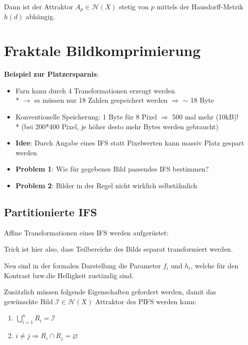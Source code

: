 \documentclass[afourpaper]{latex-classes/handout}
\newcommand{\marginrule}{\makebox[\linewidth]{\rule{\linewidth}{0.4pt}}}
\renewcommand{\emph}[1]{\textcolor{kitGreen}{#1}}
\begin{document}
Dann ist der Attraktor \( A_p \in \mathcal{H}(X) \) stetig von \( p \) mittels der Hausdorff-Metrik \( h(d) \) abhängig.

\section{Fraktale Bildkomprimierung}

\begin{marginfigure}[10em]
  \textbf{Beispiel zur Platzersparnis}: \\
  \begin{itemize}
    \item Farn kann durch 4 Transformationen erzeugt werden \\*
      \( \to \) es müssen nur 18 Zahlen gespeichert werden \( \Rightarrow \) \emph{\( \sim \) 18 Byte}
    \item Konventionelle Speicherung: 1 Byte für 8 Pixel \( \Rightarrow \) \emph{500 mal mehr} (10kB)! \\*
    (bei 200*400 Pixel, je höher desto mehr Bytes werden gebraucht)
  \end{itemize}
  \marginrule{}
\end{marginfigure}

\begin{itemize}
  \item \textbf{Idee}: Durch Angabe eines IFS statt Pixelwerten kann massiv Platz gespart werden
  \item \textbf{Problem 1}: Wie für gegebenes Bild passendes IFS bestimmen?
  \item \textbf{Problem 2}: Bilder in der Regel nicht wirklich selbstähnlich
\end{itemize}

\subsection{Partitionierte IFS}

Affine Transformationen eines IFS werden aufgerüstet:

\begin{marginfigure}
  Trick ist hier also, dass Teilbereiche des Bilds separat transformiert werden.

  Neu sind in der formalen Darstellung die Parameter \( f_i \) und \( h_i \), welche für den Kontrast bzw.\@ die Helligkeit zuständig sind.

  Zusätzlich müssen folgende Eigenschaften gefordert werden, damit das gewünschte Bild \( \mathcal{I} \in \mathcal{H}(X) \) Attraktor des PIFS werden kann:
  \begin{enumerate}
    \item \( \bigcup_{i=1}^n R_i = \mathcal{I} \)
    \item \( i \neq j \Rightarrow R_i \cap R_j = \varnothing \)
  \end{enumerate}
\end{marginfigure}
\end{document}
